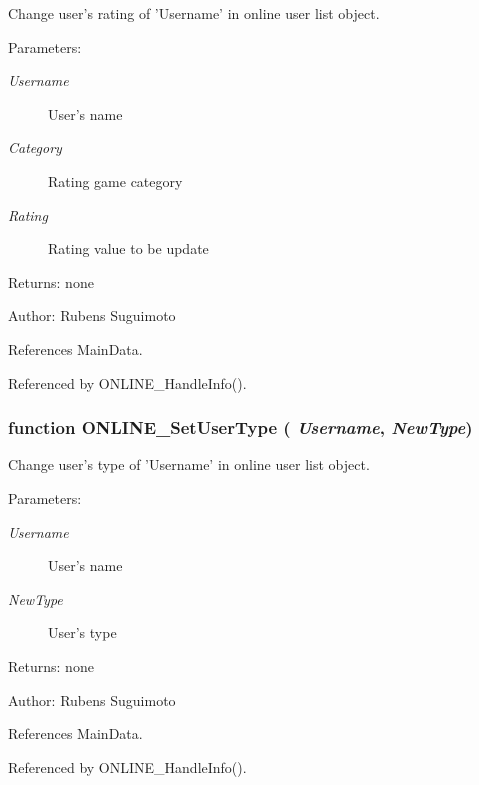 Change user's rating of 'Username' in online user list object. 

\begin{Desc}
\item[Parameters:]
\begin{description}
\item[{\em Username}]User's name \item[{\em Category}]Rating game category \item[{\em Rating}]Rating value to be update \end{description}
\end{Desc}
\begin{Desc}
\item[Returns:]none \end{Desc}
\begin{Desc}
\item[Author:]Rubens Suguimoto \end{Desc}


References MainData.

Referenced by ONLINE\_\-HandleInfo().
\subsubsection[ONLINE\_\-SetUserType]{\setlength{\rightskip}{0pt plus 5cm}function ONLINE\_\-SetUserType ( {\em Username}, \/   {\em NewType})}\label{online__info_8js_31a2a7af36722eb0047e2e42231a081f}


Change user's type of 'Username' in online user list object. 

\begin{Desc}
\item[Parameters:]
\begin{description}
\item[{\em Username}]User's name \item[{\em NewType}]User's type \end{description}
\end{Desc}
\begin{Desc}
\item[Returns:]none \end{Desc}
\begin{Desc}
\item[Author:]Rubens Suguimoto \end{Desc}


References MainData.

Referenced by ONLINE\_\-HandleInfo().